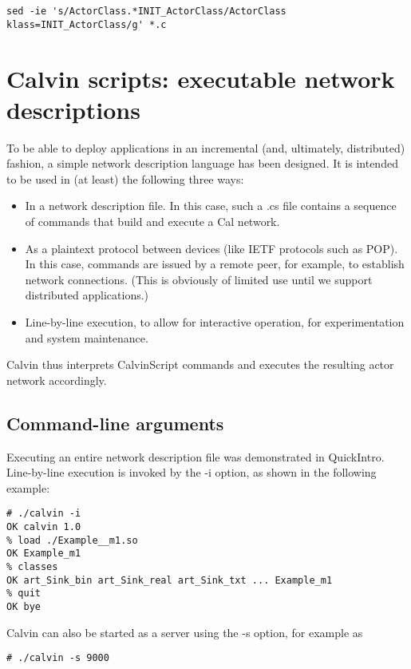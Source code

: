 \documentclass[10pt, a4paper]{article}
\begin{document}
\begin{verbatim}
sed -ie 's/ActorClass.*INIT_ActorClass/ActorClass klass=INIT_ActorClass/g' *.c
\end{verbatim}

\section{Calvin scripts: executable network descriptions}
\label{CalvinScript}

To be able to deploy applications in an incremental (and, ultimately,
distributed) fashion, a simple network description language has been
designed. It is intended to be used in (at least) the following three
ways:

\begin{itemize}
\item In a network description file. In this case, such a .cs file
  contains a sequence of commands that build and execute a Cal
  network.
\item As a plaintext protocol between devices (like IETF protocols
  such as POP). In this case, commands are issued by a remote peer,
  for example, to establish network connections. (This is obviously of
  limited use until we support distributed applications.)
\item Line-by-line execution, to allow for interactive operation, for
  experimentation and system maintenance.
\end{itemize}

Calvin thus interprets CalvinScript commands and executes the
resulting actor network accordingly.

\subsection{Command-line arguments}

Executing an entire network description file was demonstrated in
QuickIntro. Line-by-line execution is invoked by the -i option, as
shown in the following example:

\begin{verbatim}
# ./calvin -i
OK calvin 1.0
% load ./Example__m1.so
OK Example_m1
% classes
OK art_Sink_bin art_Sink_real art_Sink_txt ... Example_m1
% quit
OK bye
\end{verbatim}

Calvin can also be started as a server using the -s option, for example as

\begin{verbatim}
# ./calvin -s 9000
\end{verbatim}
\end{document}
